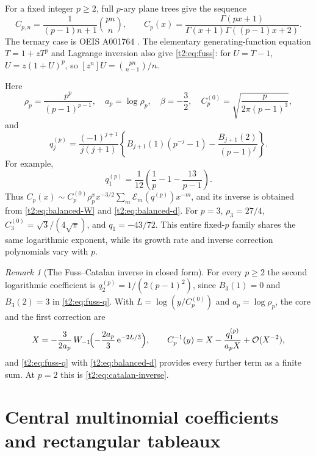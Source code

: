 \documentclass[11pt,openany]{book}
\numberwithin{equation}{chapter}
\theoremstyle{plain}
\theoremstyle{definition}
\theoremstyle{remark}
\newtheorem{remark}[theorem]{Remark}
\newcommand{\ee}{\mathrm e}
\newcommand{\cE}{\mathcal E}\newcommand{\cL}{\mathcal L}
\begin{document}
For a fixed integer $p\ge2$, full $p$-ary plane trees give the sequence
\begin{equation}
 C_{p,n}=\frac1{(p-1)n+1}\binom{pn}{n},\qquad
 C_p(x)=\frac{\Gamma(px+1)}{\Gamma(x+1)\Gamma((p-1)x+2)}.
 \label{t2:eq:fuss}
\end{equation}
The ternary case is OEIS A001764 \cite{oeisfuss}. The elementary generating-function equation $T=1+zT^p$ and Lagrange inversion also give \eqref{t2:eq:fuss}: for $U=T-1$, $U=z(1+U)^p$, so
$[z^n]U=\binom{pn}{n-1}/n$.

Here
\begin{equation}
 \rho_p=\frac{p^p}{(p-1)^{p-1}},\quad
 a_p=\log\rho_p,\quad \beta=-\frac32,\quad
 C_p^{(0)}=\sqrt{\frac{p}{2\pi(p-1)^3}},
 \label{t2:eq:fuss-constants}
\end{equation}
and
\begin{equation}
 q_j^{(p)}=\frac{(-1)^{j+1}}{j(j+1)}
 \left\{B_{j+1}(1)(p^{-j}-1)
             -\frac{B_{j+1}(2)}{(p-1)^j}\right\}.
 \label{t2:eq:fuss-q}
\end{equation}
For example,
\[
 q_1^{(p)}=\frac1{12}\left(\frac1p-1-\frac{13}{p-1}\right).
\]
Thus $C_p(x)\sim C_p^{(0)}\rho_p^x x^{-3/2}\sum_m\cE_m(q^{(p)})x^{-m}$, and its inverse is obtained from \eqref{t2:eq:balanced-W} and \eqref{t2:eq:balanced-d}. For $p=3$, $\rho_3=27/4$, $C_3^{(0)}=\sqrt3/(4\sqrt\pi)$, and $q_1=-43/72$. This entire fixed-$p$ family shares the same logarithmic exponent, while its growth rate and inverse correction polynomials vary with $p$.

\begin{remark}[The Fuss--Catalan inverse in closed form]
\label{ct:rmk:fuss-inverse}
For every $p\ge2$ the second logarithmic coefficient is
$q_2^{(p)}=1/(2(p-1)^2)$, since $B_3(1)=0$ and $B_3(2)=3$ in
\cref{t2:eq:fuss-q}.  With $L=\log(y/C_p^{(0)})$ and $a_p=\log\rho_p$, the
core and the first correction are
\begin{equation}
 X=-\frac{3}{2a_p}\,W_{-1}\!\Bigl(-\frac{2a_p}{3}\,\ee^{-2L/3}\Bigr),\qquad
 C_p^{-1}(y)=X-\frac{q_1^{(p)}}{a_pX}+\bigO(X^{-2}),
 \label{ct:eq:fuss-inverse}
\end{equation}
and \cref{t2:eq:fuss-q} with \cref{t2:eq:balanced-d} provides every further
term as a finite sum.  At $p=2$ this is \cref{t2:eq:catalan-inverse}.
\end{remark}

\section{Central multinomial coefficients and rectangular tableaux}
\end{document}

